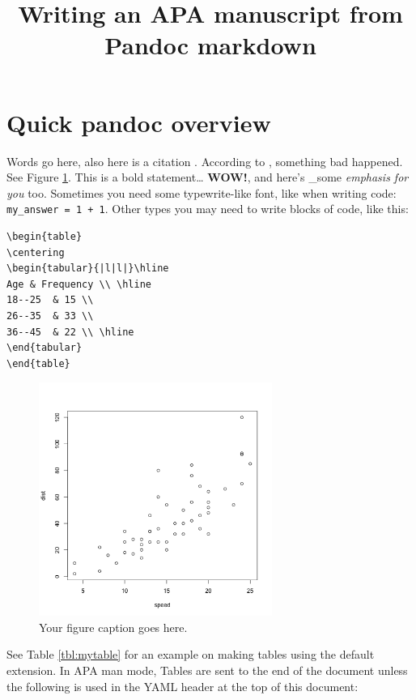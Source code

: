 \documentclass[doc,longtable]{apa6}
\title{Writing an APA manuscript from Pandoc markdown}
\begin{document}
\maketitle

\section{Quick pandoc overview}\label{quick-pandoc-overview}

Words go here, also here is a citation \autocite{someArticle}. According to \textcite{anotherArticle}, something bad happened. See Figure \ref{fig:myplot}. This is a bold statement\ldots{} \textbf{WOW!}, and here's \_some \emph{emphasis for you} too. Sometimes you need some typewrite-like font, like when writing code: \texttt{my\_answer\ =\ 1\ +\ 1}. Other types you may need to write blocks of code, like this:

\begin{verbatim}
\begin{table}
\centering
\begin{tabular}{|l|l|}\hline
Age & Frequency \\ \hline
18--25  & 15 \\
26--35  & 33 \\
36--45  & 22 \\ \hline
\end{tabular}
\end{table}
\end{verbatim}

\begin{figure}[htbp]
\centering
\includegraphics[width=3.00000in]{example/plot.png}
\caption{Your figure caption goes here.\label{fig:myplot}}
\end{figure}

See Table \ref{tbl:mytable} for an example on making tables using the default extension. In APA man mode, Tables are sent to the end of the document unless the following is used in the YAML header at the top of this document:
\end{document}
